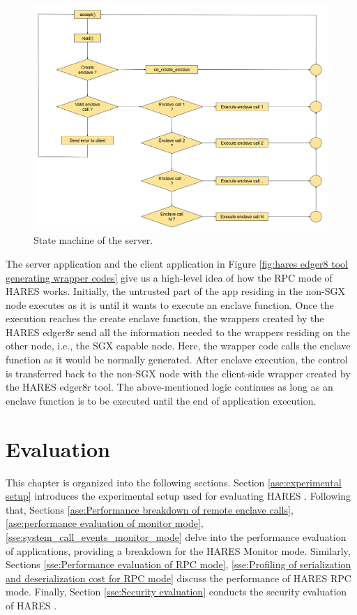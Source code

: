 \documentclass[article, doublespace,nopageskip]{VTthesis} %
\newcommand{\monitor}{HARES }
\begin{document}
    \begin{figure}[htb]
        \includegraphics[scale=0.3]{figures/server_state_machine.png}
        \caption{State machine of the server.} 
        \label{fig:server_state_machine}
    \end{figure}
    
    The server application and the client application in Figure \ref{fig:hares edger8 tool generating wrapper codes} give us a high-level idea of how the RPC mode of \monitor works. Initially, the untrusted part of the app residing in the non-SGX node executes as it is until it wants to execute an enclave function. Once the execution reaches the create enclave function, the wrappers created by the \monitor edger8r send all the information needed to the wrappers residing on the other node, i.e., the SGX capable node. Here, the wrapper code calls the enclave function as it would be normally generated. After enclave execution, the control is transferred back to the non-SGX node with the client-side wrapper created by the \monitor edger8r tool. The above-mentioned logic continues as long as an enclave function is to be executed until the end of application execution. 

    \chapter{Evaluation}
    This chapter is organized into the following sections. Section \ref{ase:experimental setup} introduces the experimental setup used for evaluating \monitor. Following that, Sections \ref{ase:Performance breakdown of remote enclave calls}, \ref{ase:performance evaluation of monitor mode}, \ref{sse:system_call_events_monitor_mode} delve into the performance evaluation of applications, providing a breakdown for the \monitor Monitor mode. Similarly, Sections \ref{sse:Performance evaluation of RPC mode}, \ref{sse:Profiling of serialization and deserialization cost for RPC mode} discuss the performance of \monitor RPC mode. Finally, Section \ref{sse:Security evaluation} conducts the security evaluation of \monitor.
    
\end{document}
